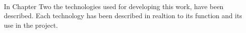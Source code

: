 \paragraph{}
In Chapter Two the technologies used for developing this work, have been described.
Each technology has been described in realtion to its function and its use in the project.